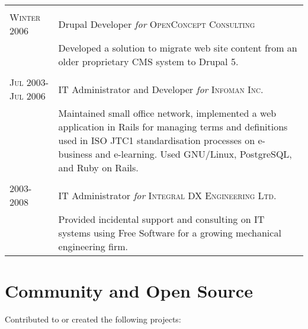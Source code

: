 \documentclass[letterpaper,10pt]{article}
\begin{document}
\begin{longtable}{p{3cm}|p{12cm}}
  \multicolumn{2}{c}{} \\
  \textsc{Winter 2006} & Drupal Developer \emph{for} \textsc{OpenConcept Consulting} \\
   & \footnotesize{Developed a solution to migrate web site content from an older proprietary CMS system to Drupal 5.} \\
  \multicolumn{2}{c}{} \\
  \textsc{Jul 2003-Jul 2006} & IT Administrator and Developer \emph{for} \textsc{Infoman Inc.} \\
   & \footnotesize{Maintained small office network, implemented a web application in Rails for managing terms and definitions used in ISO JTC1 standardisation processes on e-business and e-learning.  Used GNU/Linux, PostgreSQL, and Ruby on Rails.} \\
  \multicolumn{2}{c}{} \\
  \textsc{2003-2008} & IT Administrator \emph{for} \textsc{Integral DX Engineering Ltd.} \\
   & \footnotesize{Provided incidental support and consulting on IT systems using Free Software for a growing mechanical engineering firm.} \\

\end{longtable}

\pagebreak

\section{Community and Open Source}
Contributed to or created the following projects:
\end{document}
